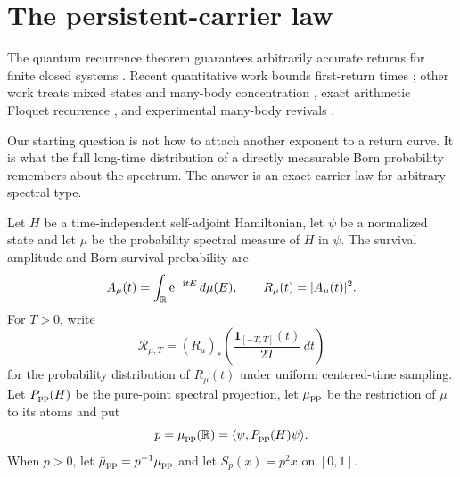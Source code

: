 \section{The persistent-carrier law}

The quantum recurrence theorem guarantees arbitrarily accurate returns for
finite closed systems \cite{BocchieriLoinger1957}.  Recent quantitative work
bounds first-return times \cite{KotowskiOszmaniec2026,GuptaShort2026}; other
work treats mixed states and many-body concentration
\cite{GimenoSotoca2017,RiddellPagliaroliAlhambra2023}, exact arithmetic
Floquet recurrence \cite{AnandEtAl2026}, and experimental many-body revivals
\cite{RauerEtAl2018,KarimiEtAl2026}.

Our starting question is not how to attach another exponent to a return
curve.  It is what the full long-time distribution of a directly measurable
Born probability remembers about the spectrum.  The answer is an exact
carrier law for arbitrary spectral type.

Let $H$ be a time-independent self-adjoint Hamiltonian, let $\psi$ be a
normalized state and let $\mu$ be the probability spectral measure of $H$ in
$\psi$.  The survival amplitude and Born survival probability are
\begin{equation}
 A_\mu(t)=\int_\mathbb R \mathrm e^{-\mathrm i tE}\,d\mu(E),
 \qquad R_\mu(t)=|A_\mu(t)|^2.                       \label{eq:physicalsurvival}
\end{equation}
For $T>0$, write
\begin{equation}
 \mathscr R_{\mu,T}=(R_\mu)_*
 \left(\frac{\mathbf 1_{[-T,T]}(t)}{2T}\,dt\right)  \label{eq:finite-return-law}
\end{equation}
for the probability distribution of $R_\mu(t)$ under uniform centered-time
sampling.  Let $P_{\rm pp}(H)$ be the pure-point spectral projection, let
$\mu_{\rm pp}$ be the restriction of $\mu$ to its atoms and put
\begin{equation}
 p=\mu_{\rm pp}(\mathbb R)=\langle\psi,P_{\rm pp}(H)\psi\rangle.
                                                        \label{eq:boundmass-intro}
\end{equation}
When $p>0$, let $\bar\mu_{\rm pp}=p^{-1}\mu_{\rm pp}$ and let
$S_p(x)=p^2x$ on $[0,1]$.

